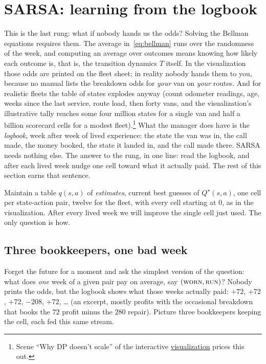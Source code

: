 \documentclass[11pt,a4paper]{article}
\theoremstyle{definition}
\theoremstyle{remark}
\numberwithin{equation}{section}
\newcommand{\sa}[1]{\textsc{#1}}   %
\newcommand{\vizhref}[1]{\href{https://sml-fs26.github.io/classic_rl/repair-or-replace/}{#1}}
\begin{document}
\section{SARSA: learning from the logbook}\label{sec:sarsa}

This is the last rung: what if nobody hands us the odds? Solving the Bellman equations
requires them. The average in~\eqref{eq:bellman} runs over the randomness of the week, and
computing an average over outcomes means knowing how likely each outcome is, that is, the
transition dynamics $T$ itself. In the visualization those odds are printed on the fleet
sheet; in reality nobody hands them to you, because no manual lists the breakdown odds for
\emph{your} van on \emph{your} routes. And for realistic fleets the table of states explodes
anyway (count odometer readings, age, weeks since the last service, route load, then forty
vans, and the visualization's illustrative tally reaches some four million states for a
single van and half a billion scorecard cells for a modest fleet).\footnote{Scene ``Why DP
doesn't scale'' of the interactive \vizhref{visualization} prices this out.} What the manager
does have is the \emph{logbook}, week after week of lived experience: the state the van was
in, the call made, the money booked, the state it landed in, and the call made there. SARSA
needs nothing else. The answer to the rung, in one line: read the logbook, and after each
lived week nudge one cell toward what it actually paid. The rest of this section earns that
sentence.

Maintain a table $q(s, a)$ of \emph{estimates}, current best guesses of $Q^\star(s, a)$, one
cell per state-action pair, twelve for the fleet, with every cell starting at $0$, as in the
visualization. After every lived week we will improve the single cell just used. The only
question is how.

\subsection*{Three bookkeepers, one bad week}

Forget the future for a moment and ask the simplest version of the question: what does
\emph{one} week of a given pair pay on average, say $(\sa{worn}, \sa{run})$? Nobody prints the
odds, but the logbook shows what those weeks actually paid: $+72$, $+72$, $+72$, $-208$,
$+72$, \dots{} (an excerpt, mostly profits with the occasional breakdown that books the $72$
profit minus the $280$ repair). Picture three bookkeepers keeping the cell, each fed this same
stream.
\end{document}
